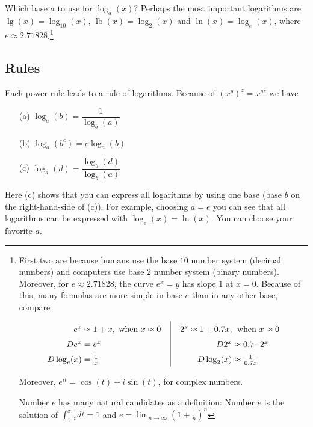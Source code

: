 \documentclass[12pt]{article}
\newcommand{\lb}[0]{\operatorname{lb}}
\begin{document}
Which base \(a\) to use for \(\log_a(x)\)? Perhaps the most important logarithms are \(\lg(x)=\log_{10}(x)\), \(\lb(x)=\log_2(x)\) and \(\ln(x)=\log_e(x)\), where \(e\approx 2.71828\).\footnote{First two are because humans use the base \(10\) number system (decimal numbers) and computers use base \(2\) number system (binary numbers).  Moreover, for \(e\approx 2.71828\), the curve \(e^x=y\) has slope \(1\) at \(x=0\). Because of this, many formulas are more simple in base \(e\) than in any other base, compare

$$\arraycolsep=1.4pt\def\arraystretch{1.5}
\begin{array}{rl|rl}
e^x&\approx 1+x, \textrm{ when } x\approx 0\quad
& \quad 2^x\approx 1+0.7x, & \textrm{ when } x\approx 0\\
De^x&=e^x & D2^x&\approx 0.7\cdot 2^x\\
D\log_e(x)&=\frac{1}{x} & D\log_2(x)&\approx \frac{1}{0.7x}\\
\end{array}
$$

Moreover, \(e^{it}=\cos(t)+i\sin(t)\), for complex numbers.

Number \(e\) has many natural candidates as a definition: Number \(e\) is the solution of \(\int_1^x\frac{1}{t}dt=1\) and 
\(e=\lim_{n\to\infty}\left(1+\frac{1}{n}\right)^n\)}

\newpage

\subsection*{Rules}

Each power rule leads to a rule of logarithms. Because of \((x^y)^z=x^{yz}\) we have

\begin{enumerate}
\item [(a)] $\log_a(b)=\dfrac{1}{\log_b(a)}$
\item [(b)] $\log_a(b^c)=c\log_a(b)$
\item [(c)] $\log_a(d)=\dfrac{\log_b(d)}{\log_b(a)}$
\end{enumerate}

Here (c) shows that you can express all logarithms by using one base (base $b$ on the right-hand-side of (c)). For example, choosing \(a=e\) you can see that all logarithms can be expressed with \(\log_e(x)=\ln(x)\). You can choose your favorite \(a\).\\[2mm]
\end{document}

